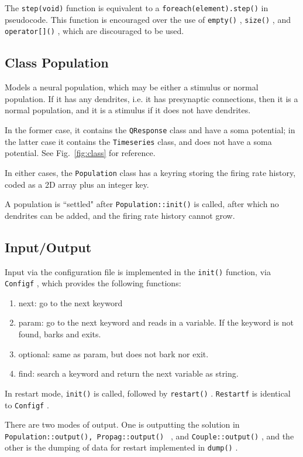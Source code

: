 \documentclass[12pt,a4paper]{article}
\newcommand{\type}[1]{ {\small\small\tt #1} }
\begin{document}
The \type{step(void)} function is equivalent to a \type{foreach(element).step()} in pseudocode. This function is encouraged over the use of \type{empty()}, \type{size()}, and \type{operator[]()}, which are discouraged to be used.

\subsection{Class Population}
\label{sec:newpop}

Models a neural population, which may be either a stimulus or normal population. If it has any dendrites, i.e. it has presynaptic connections, then it is a normal population, and it is a stimulus if it does not have dendrites.

In the former case, it contains the \type{QResponse} class and have a soma potential; in the latter case it contains the \type{Timeseries} class, and does not have a soma potential. See Fig.~\ref{fig:class} for reference.

In either cases, the \type{Population} class has a keyring storing the firing rate history, coded as a 2D array plus an integer key.

A population is ``settled" after \type{Population::init()} is called, after which no dendrites can be added, and the firing rate history cannot grow.

\subsection{Input/Output}

Input via the configuration file is implemented in the \type{init()} function, via \type{Configf}, which provides the following functions:
	\begin{enumerate}
	\item next: go to the next keyword
	\item param: go to the next keyword and reads in a variable. If the keyword is not found, barks and exits.
	\item optional: same as param, but does not bark nor exit.
	\item find: search a keyword and return the next variable as string.
	\end{enumerate}

In restart mode, \type{init()} is called, followed by \type{restart()}. \type{Restartf} is identical to \type{Configf}.

There are two modes of output. One is outputting the solution in \type{Population::output(), \type{Propag::output()}}, and \type{Couple::output()}, and the other is the dumping of data for restart implemented in \type{dump()}.
\end{document}

